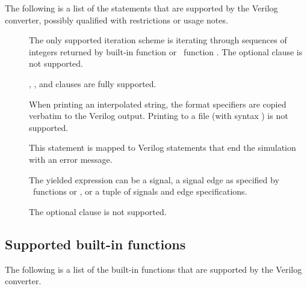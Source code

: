 The following is a list of the statements that are supported by the
Verilog converter, possibly qualified with restrictions
or usage notes. 

\begin{description}

\item[]

\item[]

\item[]

\item[]
The only supported iteration scheme is iterating through sequences of
integers returned by built-in function  or \myhdl\
function .  The optional  clause is
not supported.

\item[]
\keyword{if}, , and  clauses
are fully supported.

\item[]

\item[]
When printing an interpolated string, the format specifiers are copied
verbatim to the Verilog output.  Printing to a file (with syntax
\code{'>>'}) is not supported.

\item[]
This statement is mapped to Verilog statements
that end the simulation with an error message.

\item[]

\item[] 
The yielded expression can be a signal, a signal edge
as specified by \myhdl\ functions 
or , or a tuple of signals and
edge specifications.

\item[]
The optional 
clause is not supported.

\end{description}

\subsection{Supported built-in functions\label{conv-subset-builtin}}

The following is a list of the built-in functions that are supported by the
Verilog converter.

